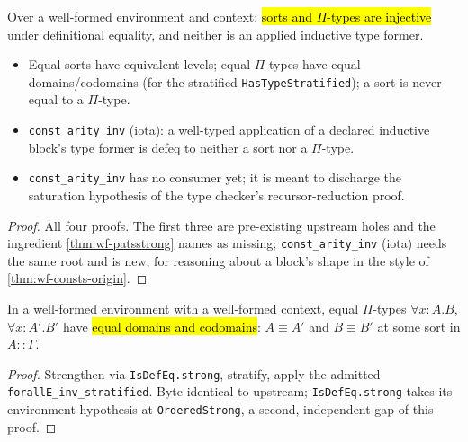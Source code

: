 \begin{lemma}
\label{thm:injectivity-open}
\leanok
{}

 Over a well-formed environment and context: \hl{sorts and $\Pi$-types are
injective} under definitional equality, and neither is an applied inductive type former.
\begin{itemize}
\item Equal sorts have equivalent levels; equal $\Pi$-types have equal domains/codomains
  (for the stratified \texttt{HasTypeStratified}); a sort is never equal to a $\Pi$-type.
\item \texttt{const\_arity\_inv} (iota): a well-typed application of a declared inductive
  block's type former is defeq to neither a sort nor a $\Pi$-type.
\item {} \texttt{const\_arity\_inv} has no consumer yet; it is meant to discharge
  the saturation hypothesis of the type checker's recursor-reduction proof.
\end{itemize}
\end{lemma}
\begin{proof}
\stSorry{}  All four proofs. The first three are pre-existing upstream holes and
the ingredient \ref{thm:wf-patsstrong} names as missing; \texttt{const\_arity\_inv} (iota)
needs the same root and is new, for reasoning about a block's shape in the style of
\ref{thm:wf-consts-origin}.
\end{proof}

\begin{lemma}
\label{thm:foralle-inv-derived}
\leanok
{}

 In a well-formed environment with a well-formed context, equal $\Pi$-types
$\forall x{:}A.B$, $\forall x{:}A'.B'$ have \hl{equal domains and codomains}: $A\equiv A'$
and $B\equiv B'$ at some sort in $A::\Gamma$.
\end{lemma}
\begin{proof}
\leanok
{} Strengthen via \texttt{IsDefEq.strong}, stratify, apply the admitted
\texttt{forallE\_inv\_stratified}. Byte-identical to upstream; \texttt{IsDefEq.strong} takes its
environment hypothesis at \texttt{OrderedStrong}, a second, independent gap of this proof.
\end{proof}


